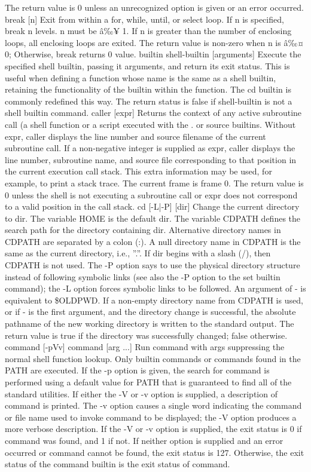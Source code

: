 The return value is 0 unless an unrecognized option is given or an error occurred.
break [n]
Exit from within a for, while, until, or select loop. If n is specified, break n levels. n must be â‰¥ 1. If n is greater than the number of enclosing loops, all enclosing loops are exited. The return value is non-zero when n is â‰¤ 0; Otherwise, break returns 0 value.
builtin shell-builtin [arguments]
Execute the specified shell builtin, passing it arguments, and return its exit status. This is useful when defining a function whose name is the same as a shell builtin, retaining the functionality of the builtin within the function. The cd builtin is commonly redefined this way. The return status is false if shell-builtin is not a shell builtin command.
caller [expr]
Returns the context of any active subroutine call (a shell function or a script executed with the . or source builtins. Without expr, caller displays the line number and source filename of the current subroutine call. If a non-negative integer is supplied as expr, caller displays the line number, subroutine name, and source file corresponding to that position in the current execution call stack. This extra information may be used, for example, to print a stack trace. The current frame is frame 0. The return value is 0 unless the shell is not executing a subroutine call or expr does not correspond to a valid position in the call stack.
cd [-L|-P] [dir]
Change the current directory to dir. The variable HOME is the default dir. The variable CDPATH defines the search path for the directory containing dir. Alternative directory names in CDPATH are separated by a colon (:). A null directory name in CDPATH is the same as the current directory, i.e., ''.''. If dir begins with a slash (/), then CDPATH is not used. The -P option says to use the physical directory structure instead of following symbolic links (see also the -P option to the set builtin command); the -L option forces symbolic links to be followed. An argument of - is equivalent to \$OLDPWD. If a non-empty directory name from CDPATH is used, or if - is the first argument, and the directory change is successful, the absolute pathname of the new working directory is written to the standard output. The return value is true if the directory was successfully changed; false otherwise.
command [-pVv] command [arg ...]
Run command with args suppressing the normal shell function lookup. Only builtin commands or commands found in the PATH are executed. If the -p option is given, the search for command is performed using a default value for PATH that is guaranteed to find all of the standard utilities. If either the -V or -v option is supplied, a description of command is printed. The -v option causes a single word indicating the command or file name used to invoke command to be displayed; the -V option produces a more verbose description. If the -V or -v option is supplied, the exit status is 0 if command was found, and 1 if not. If neither option is supplied and an error occurred or command cannot be found, the exit status is 127. Otherwise, the exit status of the command builtin is the exit status of command.
